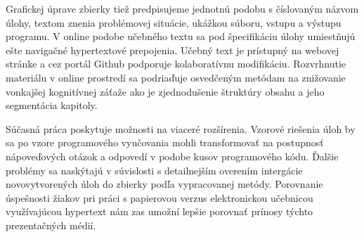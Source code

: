 Grafickej úprave zbierky tiež predpisujeme jednotnú podobu s číslovaným názvom úlohy, textom znenia problémovej situácie, ukážkou súboru, vstupu a výstupu programu. V online podobe učebného textu sa pod špecifikáciu úlohy umiestňujú ešte navigačné hypertextové prepojenia. Učebný text je prístupný na webovej stránke a cez portál Github podporuje kolaboratívnu modifikáciu. Rozvrhnutie materiálu v online prostredí sa podriaďuje osvedčeným metódam na znižovanie vonkajšej kognitívnej záťaže ako je zjednodušenie štruktúry obsahu a jeho segmentácia kapitoly.

Súčasná práca poskytuje možnosti na viaceré rozšírenia. Vzorové riešenia úloh by sa po vzore programového vyučovania mohli transformovať na postupnosť nápoveďových otázok a odpovedí v podobe kusov programového kódu. Ďalšie problémy sa naskýtajú v súvislosti s detailnejším overením intergácie novovytvorených úloh do zbierky podľa vypracovanej metódy. Porovnanie úspešnosti žiakov pri práci s papierovou verzus elektronickou učebnicou využívajúcou hypertext nám zas umožní lepšie porovnať prínosy týchto prezentačných médií.
